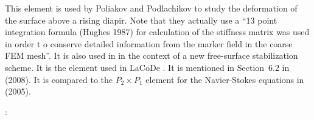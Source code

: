 This element is used by Poliakov and Podlachikov \cite{popo92} to study the deformation of 
the surface above a rising diapir. Note that they actually use a 
``13 point integration formula (Hughes 1987) for calculation of the stiffness matrix was 
used in order t o conserve detailed information from the marker field in the coarse FEM mesh''. 
It is also used in \cite{anmp15} in the context of a new free-surface stabilization scheme. 
It is the element used in LaCoDe \cite{demh19}.
It is mentioned in Section~6.2 in \textcite{bobf08} (2008).
It is compared to the $P_2\times P_1$ element for the Navier-Stokes equations in 
\textcite{krba05} (2005).

\Literature: \textcite{hala03}
